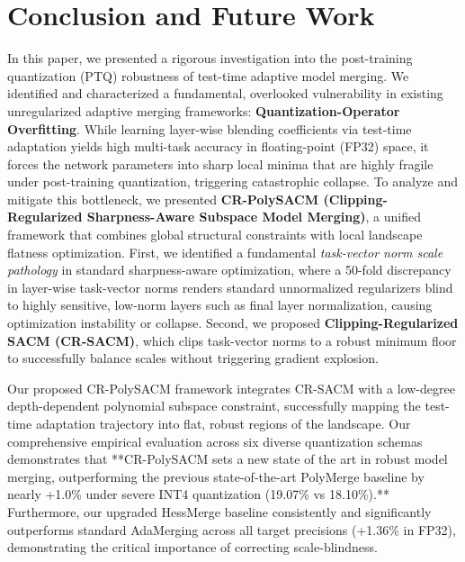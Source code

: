 \section{Conclusion and Future Work}
\label{sec:conclusion}

In this paper, we presented a rigorous investigation into the post-training quantization (PTQ) robustness of test-time adaptive model merging. We identified and characterized a fundamental, overlooked vulnerability in existing unregularized adaptive merging frameworks: \textbf{Quantization-Operator Overfitting}. While learning layer-wise blending coefficients via test-time adaptation yields high multi-task accuracy in floating-point (FP32) space, it forces the network parameters into sharp local minima that are highly fragile under post-training quantization, triggering catastrophic collapse.
To analyze and mitigate this bottleneck, we presented \textbf{CR-PolySACM (Clipping-Regularized Sharpness-Aware Subspace Model Merging)}, a unified framework that combines global structural constraints with local landscape flatness optimization. First, we identified a fundamental \emph{task-vector norm scale pathology} in standard sharpness-aware optimization, where a 50-fold discrepancy in layer-wise task-vector norms renders standard unnormalized regularizers blind to highly sensitive, low-norm layers such as final layer normalization, causing optimization instability or collapse. Second, we proposed \textbf{Clipping-Regularized SACM (CR-SACM)}, which clips task-vector norms to a robust minimum floor to successfully balance scales without triggering gradient explosion.

Our proposed CR-PolySACM framework integrates CR-SACM with a low-degree depth-dependent polynomial subspace constraint, successfully mapping the test-time adaptation trajectory into flat, robust regions of the landscape. Our comprehensive empirical evaluation across six diverse quantization schemas demonstrates that **CR-PolySACM sets a new state of the art in robust model merging, outperforming the previous state-of-the-art PolyMerge baseline by nearly +1.0\% under severe INT4 quantization (19.07\% vs 18.10\%).** Furthermore, our upgraded HessMerge baseline consistently and significantly outperforms standard AdaMerging across all target precisions (+1.36\% in FP32), demonstrating the critical importance of correcting scale-blindness.

